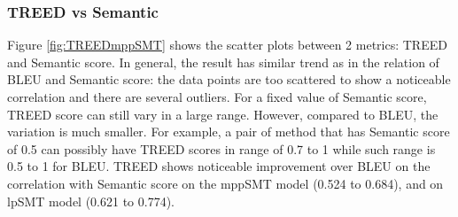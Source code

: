 \subsubsection{\textbf{TREED vs Semantic}}


Figure \ref{fig:TREEDmppSMT} shows the scatter plots between 2
metrics: TREED and Semantic score. In general, the result has similar
trend as in the relation of BLEU and Semantic score: the data points
are too scattered to show a noticeable correlation and there are
several outliers. For a fixed value of Semantic score, TREED score can
still vary in a large range. However, compared to BLEU, the variation
is much smaller. For example, a pair of method that has Semantic score
of 0.5 can possibly have TREED scores in range of 0.7 to 1 while such
range is 0.5 to 1 for BLEU. TREED shows noticeable improvement over
BLEU on the correlation with Semantic score on the mppSMT model
(0.524 to 0.684), and on lpSMT model (0.621 to 0.774).

%





